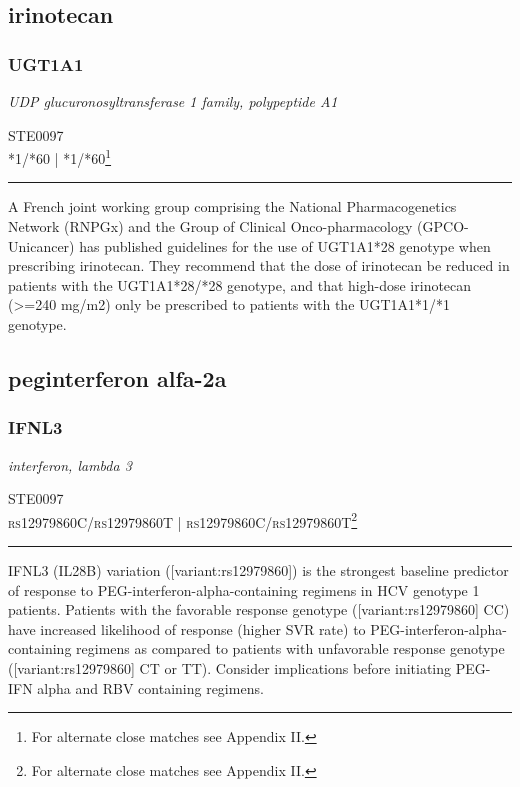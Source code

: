 \documentclass{report}
\begin{document}
\subsection{ irinotecan }

\subsubsection{ UGT1A1 }
     \textit{ UDP glucuronosyltransferase 1 family, polypeptide A1 } \begin{flushright} \textsc{ STE0097 \\ *1/*60  | *1/*60\footnote{For alternate close matches see Appendix II.} }\end{flushright}
      \hrule \vspace{6pt}
      A French joint working group comprising the National Pharmacogenetics Network (RNPGx) and the Group of Clinical Onco-pharmacology (GPCO-Unicancer) has published guidelines for the use of UGT1A1*28 genotype when prescribing irinotecan. They recommend that the dose of irinotecan be reduced in patients with the UGT1A1*28/*28 genotype, and that high-dose irinotecan (>=240 mg/m2) only be prescribed to patients with the UGT1A1*1/*1 genotype. \newline
      \scriptsize
      
      \normalsize





\subsection{ peginterferon alfa-2a }

\subsubsection{ IFNL3 }
     \textit{ interferon, lambda 3 } \begin{flushright} \textsc{ STE0097 \\ rs12979860C/rs12979860T  | rs12979860C/rs12979860T\footnote{For alternate close matches see Appendix II.} }\end{flushright}
      \hrule \vspace{6pt}
      IFNL3 (IL28B) variation ([variant:rs12979860]) is the strongest baseline predictor of response to PEG-interferon-alpha-containing regimens in HCV genotype 1 patients.  Patients with the favorable response genotype ([variant:rs12979860] CC) have increased likelihood of response (higher SVR rate) to PEG-interferon-alpha-containing regimens as compared to patients with unfavorable response genotype ([variant:rs12979860] CT or TT). Consider implications before initiating PEG-IFN alpha and RBV containing regimens. \newline
      \scriptsize
      
\end{document}
